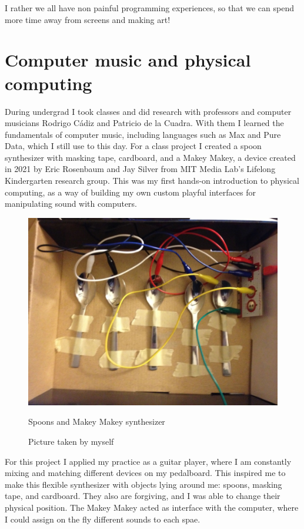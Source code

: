 I rather we all have non painful programming experiences, so that we can spend more time away from screens and making art!

\section{Computer music and physical computing}

During undergrad I took classes and did research with professors and computer musicians Rodrigo Cádiz and Patricio de la Cuadra. With them I learned the fundamentals of computer music, including languages such as Max and Pure Data, which I still use to this day. For a class project I created a spoon synthesizer with masking tape, cardboard, and a Makey Makey, a device created in 2021 by Eric Rosenbaum and Jay Silver from MIT Media Lab's Lifelong Kindergarten research group. This was my first hands-on introduction to physical computing, as a way of building my own custom playful interfaces for manipulating sound with computers.
 
\begin{figure}[ht]
  \centering
  \includegraphics[width=0.75\linewidth,height=0.25\textheight,keepaspectratio]{images/makey-makey-spoons.jpg}
  \caption{Spoons and Makey Makey synthesizer}
  \caption*{Picture taken by myself}
  \label{fig:makey-makey-spoons}
\end{figure}

For this project I applied my practice as a guitar player, where I am constantly mixing and matching different devices on my pedalboard. This inspired me to make this flexible synthesizer with objects lying around me: spoons, masking tape, and cardboard. They also are forgiving, and I was able to change their physical position. The Makey Makey acted as interface with the computer, where I could assign on the fly different sounds to each spae.

